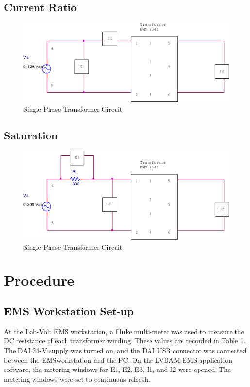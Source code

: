 \documentclass{article}
\begin{document}
\subsection{Current Ratio}
\begin{figure}[H]
  \centering
  \includegraphics[width=.8\textwidth]{img/circuit_02}
  \caption{Single Phase Transformer Circuit}
  \label{fig:circuit_02}
\end{figure}

\subsection{Saturation}
\begin{figure}[H]
  \centering
  \includegraphics[width=.8\textwidth]{img/circuit_03}
  \caption{Single Phase Transformer Circuit}
  \label{fig:circuit_03}
\end{figure}

\section{Procedure}
\subsection{EMS Workstation Set-up}
At the Lab-Volt EMS workstation, a Fluke multi-meter was used to measure the DC resistance of each transformer
winding. These values are recorded in Table 1. The DAI 24-V supply was turned on, and the DAI USB connector was 
connected between the EMSworkstation and the PC. On the LVDAM EMS application software, the metering windows 
for E1, E2, E3, I1, and I2 were opened. The metering windows were set to continuous refresh. 
\end{document}
